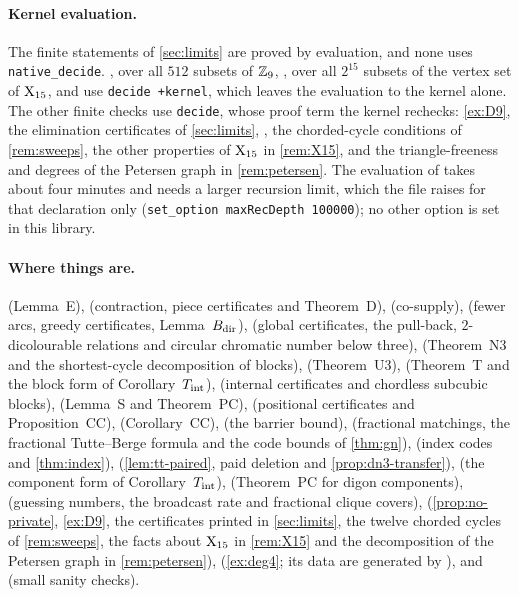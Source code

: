 \paragraph{Kernel evaluation.} The finite statements of \cref{sec:limits} are proved by evaluation, and none uses
\texttt{native\_decide}. , over all $512$ subsets of $\mathbb{Z}_9$, , over all
$2^{15}$ subsets of the vertex set of $\mathrm{X}_{15}$, and  use \texttt{decide +kernel}, which leaves the
evaluation to the kernel alone. The other finite checks use \texttt{decide}, whose proof term the kernel rechecks:
\cref{ex:D9}, the elimination certificates of \cref{sec:limits}, , the chorded-cycle conditions of
\cref{rem:sweeps}, the other properties of $\mathrm{X}_{15}$ in \cref{rem:X15}, and the triangle-freeness and degrees of the
Petersen graph in \cref{rem:petersen}. The evaluation of  takes about four minutes and needs a larger recursion limit, which
the file raises for that declaration only (\texttt{set\_option maxRecDepth 100000}); no other option is set in this
library.

\paragraph{Where things are.}  (Lemma~E),  (contraction,
piece certificates and Theorem~D),  (co-supply),  (fewer arcs, greedy
certificates, Lemma~$B_{\mathrm{dir}}$),  (global certificates, the pull-back, $2$-dicolourable relations and
circular chromatic number below three),  (Theorem~N3 and the shortest-cycle decomposition of blocks),
 (Theorem~U3),  (Theorem~T and the block form of Corollary~$T_{\mathrm{int}}$),
 (internal certificates and chordless subcubic blocks),  (Lemma~S and
Theorem~PC),  (positional certificates and Proposition~CC), 
(Corollary~CC),  (the barrier bound),  (fractional matchings, the fractional
Tutte--Berge formula and the code bounds of \cref{thm:gn}),  (index codes and
\cref{thm:index}),  (\cref{lem:tt-paired}, paid deletion and \cref{prop:dn3-transfer}),
 (the component form of Corollary~$T_{\mathrm{int}}$),  (Theorem~PC for digon
components),  (guessing numbers, the broadcast rate and fractional clique covers),
 (\cref{prop:no-private}, \cref{ex:D9}, the certificates printed in \cref{sec:limits}, the twelve
chorded cycles of \cref{rem:sweeps}, the facts about $\mathrm{X}_{15}$ in \cref{rem:X15} and the decomposition of the Petersen graph
in \cref{rem:petersen}),  (\cref{ex:deg4}; its data are generated by
), and  (small sanity checks).

